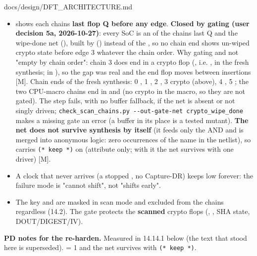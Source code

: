 \begin{relocated}{docs/design/DFT_ARCHITECTURE.md}
\begin{itemize}
\tightlist
\item
   shows each chain\textquotesingle s \textbf{last flop Q
  before any edge}. \textbf{Closed by gating (user decision 5a,
  2026-10-27)}: every SoC  is an  of
  the chain\textquotesingle s last Q and the wipe-done net
  (), built by 
  () instead of the , so no
  chain end shows un-wiped crypto state before edge 3 whatever the chain
  order. Why gating and not "empty by chain order": chain 3 does end in
  a crypto flop (, i.e.
  , in the fresh synthesis;  in
  ), so the gap was real and the end flop
  moves between insertions {[}M{]}. Chain ends of the fresh synthesis: 0
  , 1 , 2
  , 3 crypto (above), 4
  , 5
  ; the two CPU-macro chains
  end in  and
   (no crypto in the macro, so
  they are not gated). The step fails, with no buffer fallback, if the
  net is absent or not singly driven;
  \texttt{check\_\allowbreak{}scan\_\allowbreak{}chains.\allowbreak{}py\ -\allowbreak{}-\allowbreak{}out-\allowbreak{}gate-\allowbreak{}net\ crypto\_\allowbreak{}wipe\_\allowbreak{}done}
  makes a missing gate an error (a buffer in its place is a tested
  mutant). \textbf{The net does not survive synthesis by itself} (it
  feeds only the  AND and is merged into anonymous
  logic: zero occurrences of the name in the netlist), so
   carries \texttt{(*\ keep\ *)} on
   (attribute only; with it the net survives with
  one driver) {[}M{]}.
\item
  A clock that never arrives (a stopped , no
  Capture-DR) keeps  low forever: the failure mode is
  "cannot shift", not "shifts early".
\item
  The key and  are masked in scan mode and excluded from the
  chains regardless (14.2). The gate protects the \textbf{scanned}
  crypto flops (, , SHA state,
  DOUT/\allowbreak{}DIGEST/\allowbreak{}IV).
\end{itemize}

\textbf{PD notes for the re-harden.} Measured in 14.14.1 below (the
\code{[A]} text that stood here is superseded).
 = 1 and the net 
survives with \texttt{(*\ keep\ *)}.


\end{relocated}
